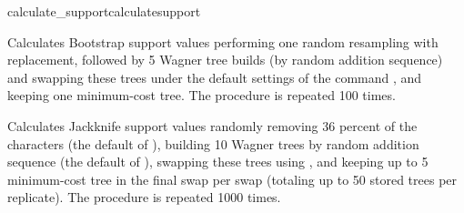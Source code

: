 \begin{command}{calculate\_support}{calculatesupport}
\begin{poyexamples}
            {Calculates Bootstrap support values performing one random resampling with
            replacement, followed by 5 Wagner tree builds (by random addition sequence)
            and swapping these trees under the default settings of the command 
            , and keeping one minimum-cost tree. The procedure
            is repeated 100 times.}
        
            {Calculates Jackknife support values randomly removing 36 percent of the
            characters (the default of ), building 10
            Wagner trees by random addition sequence (the default of
            ), swapping these trees using ,
            and keeping up to 5 minimum-cost tree in the
            final swap per swap (totaling up to 50 stored trees per replicate). 
            The procedure is repeated 1000 times.}

	\end{poyexamples}
            
	\begin{poyalso}
	\end{poyalso}

\end{command}

